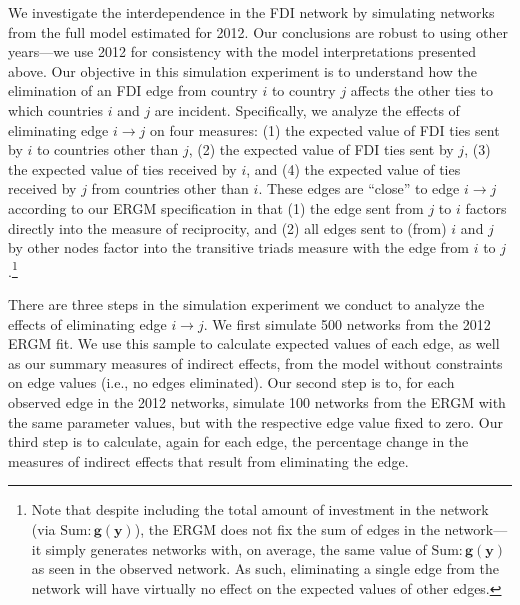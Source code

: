 \documentclass[reqno,onecolumn,letterpaper,12pt]{article}
\begin{document}
We investigate the interdependence in the FDI network by simulating networks from the full model estimated for 2012. Our conclusions are robust to using other years---we use 2012 for consistency with the model interpretations presented above. Our objective in this simulation experiment is to understand how the elimination of an FDI edge from country $i$ to country $j$ affects the other ties to which countries $i$ and $j$ are incident. Specifically, we analyze the effects of eliminating edge $i \rightarrow j$  on four measures: (1) the expected value of FDI ties sent by $i$ to countries other than $j$, (2) the expected value of FDI ties sent by $j$, (3) the expected value of ties received by $i$, and (4) the expected value of ties received by $j$ from countries other than $i$.  These edges are ``close'' to edge $i \rightarrow j$ according to our ERGM specification in that (1) the edge sent from $j$ to $i$ factors directly into the measure of reciprocity, and (2) all edges sent to (from) $i$ and $j$ by other nodes factor into the transitive triads measure with the edge from $i$ to $j$.\footnote{Note that despite including the total amount of investment in the network (via $\text{Sum}:\bm{g(y)}$), the ERGM does not fix the sum of edges in the network---it simply generates networks with, on average, the same value of $\text{Sum}:\bm{g(y)}$ as seen in the observed network. As such, eliminating a single edge from the network will have virtually no effect on the expected values of other edges.}

There are three steps in the simulation experiment we conduct to analyze the effects of eliminating edge $i \rightarrow j$. We first simulate 500 networks from the 2012 ERGM fit. We use this sample to calculate expected values of each edge, as well as our summary measures of indirect effects, from the model without constraints on edge values (i.e., no edges eliminated). Our second step is to, for each observed edge in the 2012 networks, simulate 100 networks from the ERGM with the same parameter values, but with the respective edge value fixed to zero. Our third step is to calculate, again for each edge, the percentage change in the measures of indirect effects that result from eliminating the edge.
\end{document}
